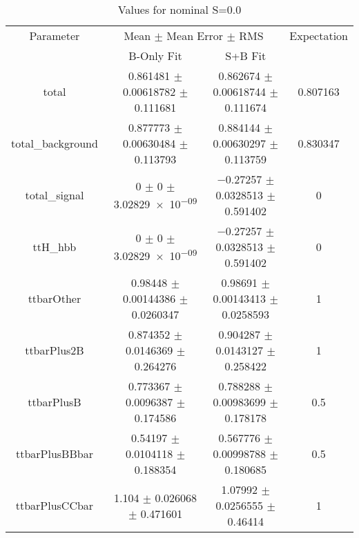 \begin{table}
\centering
\caption{Values for nominal S=0.0}
\begin{tabular}{cccc}
\toprule
Parameter & \multicolumn{2}{c}{Mean $\pm$ Mean Error $\pm$ RMS} & Expectation\\
 & B-Only Fit & S+B Fit & \\
\midrule
total & \num{0.861481} $\pm$ \num{0.00618782} $\pm$ \num{0.111681} & \num{0.862674} $\pm$ \num{0.00618744} $\pm$ \num{0.111674} & \num{0.807163}\\
total\_background & \num{0.877773} $\pm$ \num{0.00630484} $\pm$ \num{0.113793} & \num{0.884144} $\pm$ \num{0.00630297} $\pm$ \num{0.113759} & \num{0.830347}\\
total\_signal & \num{0} $\pm$ \num{0} $\pm$ \num{3.02829e-09} & \num{-0.27257} $\pm$ \num{0.0328513} $\pm$ \num{0.591402} & \num{0}\\
ttH\_hbb & \num{0} $\pm$ \num{0} $\pm$ \num{3.02829e-09} & \num{-0.27257} $\pm$ \num{0.0328513} $\pm$ \num{0.591402} & \num{0}\\
ttbarOther & \num{0.98448} $\pm$ \num{0.00144386} $\pm$ \num{0.0260347} & \num{0.98691} $\pm$ \num{0.00143413} $\pm$ \num{0.0258593} & \num{1}\\
ttbarPlus2B & \num{0.874352} $\pm$ \num{0.0146369} $\pm$ \num{0.264276} & \num{0.904287} $\pm$ \num{0.0143127} $\pm$ \num{0.258422} & \num{1}\\
ttbarPlusB & \num{0.773367} $\pm$ \num{0.0096387} $\pm$ \num{0.174586} & \num{0.788288} $\pm$ \num{0.00983699} $\pm$ \num{0.178178} & \num{0.5}\\
ttbarPlusBBbar & \num{0.54197} $\pm$ \num{0.0104118} $\pm$ \num{0.188354} & \num{0.567776} $\pm$ \num{0.00998788} $\pm$ \num{0.180685} & \num{0.5}\\
ttbarPlusCCbar & \num{1.104} $\pm$ \num{0.026068} $\pm$ \num{0.471601} & \num{1.07992} $\pm$ \num{0.0256555} $\pm$ \num{0.46414} & \num{1}\\
\bottomrule
\end{tabular}
\end{table}